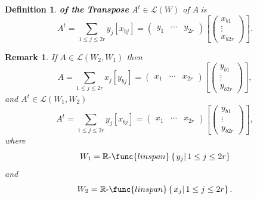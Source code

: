 \documentclass[aps,preprint]{revtex4}
\newtheorem{definition}[theorem]{Definition}
\newtheorem{remark}[theorem]{Remark}
\begin{document}
\begin{definition}
\textbf{of the} \textbf{Transpose} $A^{t}\in \mathcal{L}\left( W\right) $ of 
$A\ $is 
\begin{equation}
A^{t}=\sum_{1\leq j\leq 2r}y_{j}\left[ x_{bj}\right] =\left( 
\begin{array}{ccc}
y_{1} & \cdots & y_{2r}%
\end{array}%
\right) \left[ \left( 
\begin{array}{c}
x_{b1} \\ 
\vdots \\ 
x_{b2r}%
\end{array}%
\right) \right] .
\end{equation}
\end{definition}

\begin{remark}
If $A\in \mathcal{L}\left( W_{2},W_{1}\right) $ then 
\begin{equation}
A=\sum_{1\leq j\leq 2r}x_{j}\left[ y_{bj}\right] =\left( 
\begin{array}{ccc}
x_{1} & \cdots & x_{2r}%
\end{array}%
\right) \left[ \left( 
\begin{array}{c}
y_{b1} \\ 
\vdots \\ 
y_{b2r}%
\end{array}%
\right) \right] ,
\end{equation}%
and $A^{t}\in \mathcal{L}\left( W_{1},W_{2}\right) $ 
\begin{equation}
A^{t}=\sum_{1\leq j\leq 2r}y_{j}\left[ x_{bj}\right] =\left( 
\begin{array}{ccc}
x_{1} & \cdots & x_{2r}%
\end{array}%
\right) \left[ \left( 
\begin{array}{c}
y_{b1} \\ 
\vdots \\ 
y_{b2r}%
\end{array}%
\right) \right] ,
\end{equation}%
where 
\begin{equation}
W_{1}=\mathbb{R}\text{-}\func{linspan}\left\{ \left. y_{j}\right\vert 1\leq
j\leq 2r\right\}
\end{equation}%
and 
\begin{equation}
W_{2}=\mathbb{R}\text{-}\func{linspan}\left\{ \left. x_{j}\right\vert 1\leq
j\leq 2r\right\} .
\end{equation}
\end{remark}
\end{document}
